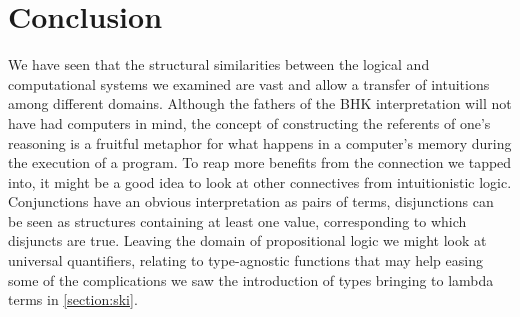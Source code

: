 \chapter{Conclusion}

We have seen that the structural similarities between the logical and
computational systems we examined are vast and allow a transfer of intuitions
among different domains. Although the fathers of the BHK interpretation will not
have had computers in mind, the concept of constructing the referents of one's
reasoning is a fruitful metaphor for what happens in a computer's memory during
the execution of a program. To reap more benefits from the connection we tapped
into, it might be a good idea to look at other connectives from intuitionistic
logic. Conjunctions have an obvious interpretation as pairs of terms,
disjunctions can be seen as structures containing at least one value,
corresponding to which disjuncts are true. Leaving the domain of propositional
logic we might look at universal quantifiers, relating to type-agnostic
functions that may help easing some of the complications we saw the introduction
of types bringing to lambda terms in \ref{section:ski}.
